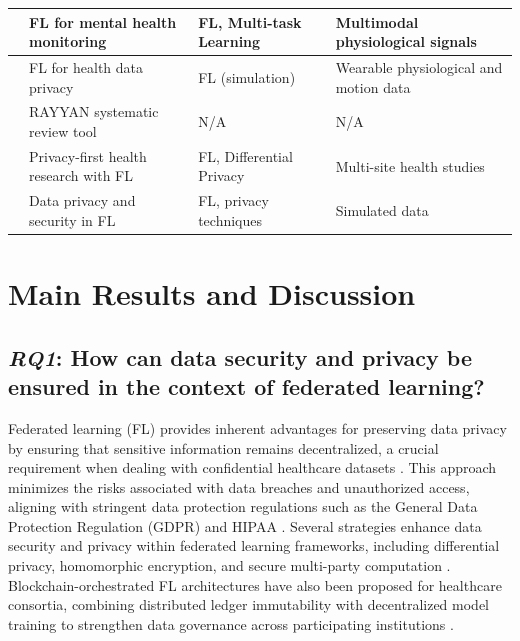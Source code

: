 \documentclass[12pt]{article}
\begin{document}
\begin{longtable}{p{4.5cm} p{3.2cm} p{2.2cm} p{2.8cm}}
\cite{mohamed_benouis_35501772} & FL for mental health monitoring & FL, Multi-task Learning & Multimodal physiological signals \\ \midrule

\cite{jessica_chia_liu_cd0e0973} & FL for health data privacy & FL (simulation) & Wearable physiological and motion data \\ \midrule

\cite{nastasha_johnson_93d644ed} & RAYYAN systematic review tool & N/A & N/A \\ \midrule

\cite{adam_sadilek_c59c73f4} & Privacy-first health research with FL & FL, Differential Privacy & Multi-site health studies \\ \midrule

\cite{chuan_ma_e07241ba} & Data privacy and security in FL & FL, privacy techniques & Simulated data \\

\end{longtable}

\endgroup



\section{Main Results and Discussion}

\subsection{\textit{RQ1}: How can data security and privacy be ensured in the context of federated learning?}


Federated learning (FL) provides inherent advantages for preserving data privacy by ensuring that sensitive information remains decentralized, a crucial requirement when dealing with confidential healthcare datasets \cite{adam_sadilek_c59c73f4}. This approach minimizes the risks associated with data breaches and unauthorized access, aligning with stringent data protection regulations such as the General Data Protection Regulation (GDPR) and HIPAA \cite{m__bharathi_b0a198b0}. Several strategies enhance data security and privacy within federated learning frameworks, including differential privacy, homomorphic encryption, and secure multi-party computation \cite{jie_xu_193cbfb6}. Blockchain-orchestrated FL architectures have also been proposed for healthcare consortia, combining distributed ledger immutability with decentralized model training to strengthen data governance across participating institutions \cite{jonathan_passerat_palmbach_a7961671}.
\end{document}
